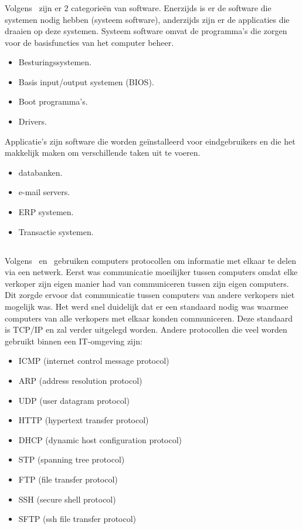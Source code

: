 \subsubsection{}
\label{subsubsec:Software}
Volgens~\textcite{Castagna2021} zijn er 2 categorieën van software. Enerzijds is er de software die systemen nodig hebben (systeem software), anderzijds zijn er de applicaties die draaien op deze systemen. Systeem software omvat de programma's die zorgen voor de basisfuncties van het computer beheer.
\begin{itemize}
    \item Besturingssystemen.
    \item Basis input/output systemen (BIOS).
    \item Boot programma's.
    \item Drivers.
\end{itemize} 
Applicatie's zijn software die worden geïnstalleerd voor eindgebruikers en die het makkelijk maken om verschillende taken uit te voeren.
\begin{itemize}
    \item databanken.
    \item e-mail servers.
    \item ERP systemen.
    \item Transactie systemen.
\end{itemize}

\subsection{}
\label{subsec:IT protocollen}
Volgens~\textcite{Sharon2019} en~\textcite{Subham2021} gebruiken computers protocollen om informatie met elkaar te delen via een netwerk. Eerst was communicatie moeilijker tussen computers omdat elke verkoper zijn eigen manier had van communiceren tussen zijn eigen computers. Dit zorgde ervoor dat communicatie tussen computers van andere verkopers niet mogelijk was. Het werd snel duidelijk dat er een standaard nodig was waarmee computers van alle verkopers met elkaar konden communiceren. Deze standaard is TCP/IP en zal verder uitgelegd worden. Andere protocollen die veel worden gebruikt binnen een IT-omgeving zijn:
\begin{itemize}
    \item ICMP (internet control message protocol)
    \item ARP (address resolution protocol)
    \item UDP (user datagram protocol)
    \item HTTP (hypertext transfer protocol)
    \item DHCP (dynamic host configuration protocol)
    \item STP (spanning tree protocol)
    \item FTP (file transfer protocol)
    \item SSH (secure shell protocol)
    \item SFTP (ssh file transfer protocol)
\end{itemize}

